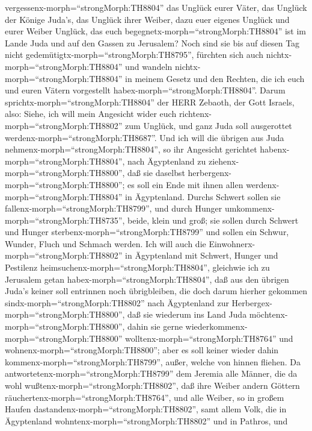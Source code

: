 vergessenx-morph=``strongMorph:TH8804'' das Unglück eurer Väter, das
Unglück der Könige Juda's, das Unglück ihrer Weiber, dazu euer eigenes
Unglück und eurer Weiber Unglück, das euch
begegnetx-morph=``strongMorph:TH8804'' ist im Lande Juda und auf den
Gassen zu Jerusalem?  Noch sind sie bis auf diesen Tag
nicht gedemütigtx-morph=``strongMorph:TH8795'', fürchten sich auch
nichtx-morph=``strongMorph:TH8804'' und wandeln
nichtx-morph=``strongMorph:TH8804'' in meinem Gesetz und den Rechten,
die ich euch und euren Vätern vorgestellt
habex-morph=``strongMorph:TH8804''.  Darum
sprichtx-morph=``strongMorph:TH8804'' der HERR Zebaoth, der Gott
Israels, also: Siehe, ich will mein Angesicht wider euch
richtenx-morph=``strongMorph:TH8802'' zum Unglück, und ganz Juda soll
ausgerottet werdenx-morph=``strongMorph:TH8687''.  Und ich
will die übrigen aus Juda nehmenx-morph=``strongMorph:TH8804'', so ihr
Angesicht gerichtet habenx-morph=``strongMorph:TH8804'', nach
Ägyptenland zu ziehenx-morph=``strongMorph:TH8800'', daß sie daselbst
herbergenx-morph=``strongMorph:TH8800''; es soll ein Ende mit ihnen
allen werdenx-morph=``strongMorph:TH8804'' in Ägyptenland. Durchs
Schwert sollen sie fallenx-morph=``strongMorph:TH8799'', und durch
Hunger umkommenx-morph=``strongMorph:TH8735'', beide, klein und groß;
sie sollen durch Schwert und Hunger
sterbenx-morph=``strongMorph:TH8799'' und sollen ein Schwur, Wunder,
Fluch und Schmach werden.  Ich will auch die
Einwohnerx-morph=``strongMorph:TH8802'' in Ägyptenland mit Schwert,
Hunger und Pestilenz heimsuchenx-morph=``strongMorph:TH8804'', gleichwie
ich zu Jerusalem getan habex-morph=``strongMorph:TH8804'', 
daß aus den übrigen Juda's keiner soll entrinnen noch übrigbleiben, die
doch darum hierher gekommen sindx-morph=``strongMorph:TH8802'' nach
Ägyptenland zur Herbergex-morph=``strongMorph:TH8800'', daß sie wiederum
ins Land Juda möchtenx-morph=``strongMorph:TH8800'', dahin sie gerne
wiederkommenx-morph=``strongMorph:TH8800''
wolltenx-morph=``strongMorph:TH8764'' und
wohnenx-morph=``strongMorph:TH8800''; aber es soll keiner wieder dahin
kommenx-morph=``strongMorph:TH8799'', außer, welche von hinnen fliehen.
 Da antwortetenx-morph=``strongMorph:TH8799'' dem Jeremia
alle Männer, die da wohl wußtenx-morph=``strongMorph:TH8802'', daß ihre
Weiber andern Göttern räuchertenx-morph=``strongMorph:TH8764'', und alle
Weiber, so in großem Haufen dastandenx-morph=``strongMorph:TH8802'',
samt allem Volk, die in Ägyptenland
wohntenx-morph=``strongMorph:TH8802'' und in Pathros, und
